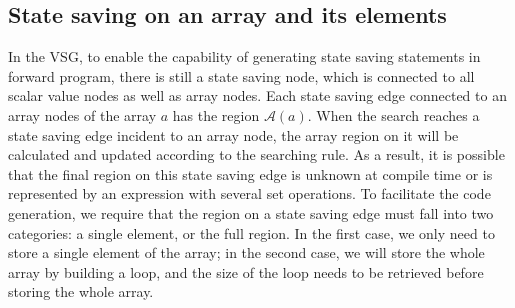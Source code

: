 \documentclass[12pt]{gatech-thesis}
\begin{document}





\subsection{State saving on an array and its elements}

In the VSG, to enable the capability of generating state saving statements in forward program, there is still a state saving node, which is connected to all scalar value nodes as well as array nodes. 
Each state saving edge connected to an array nodes of the array $a$ has the region   $\mathcal{A}(a)$.
When the search reaches a state saving edge incident to an array node, the array region on it will be calculated and updated according to the searching rule. 
As a result, it is possible that the final region on this state saving edge is unknown at compile time or is represented by an expression with several set operations.
To facilitate the code generation, we require that the region on a state saving edge must fall into two categories: a single element, or the full region. 
In the first case, we only need to store a single element of the array; in the second case, we will store the whole array by building a loop, and the size of the loop needs to be retrieved before storing the whole array. 


\end{document}
